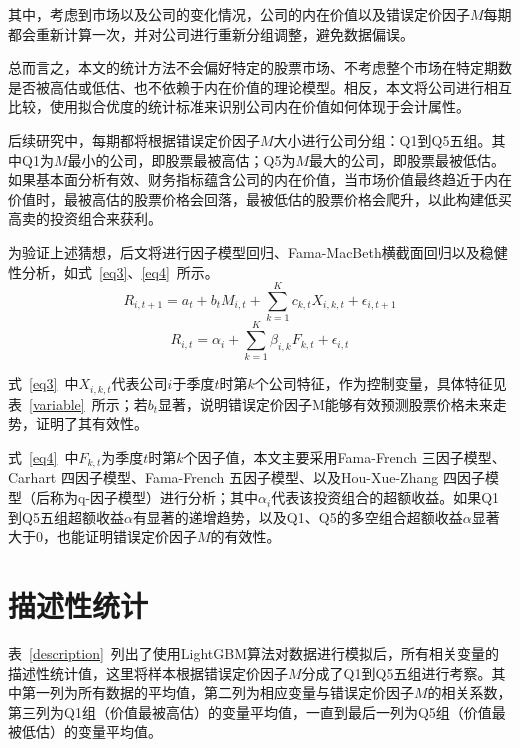其中，考虑到市场以及公司的变化情况，公司的内在价值以及错误定价因子$M$每期都会重新计算一次，并对公司进行重新分组调整，避免数据偏误。

总而言之，本文的统计方法不会偏好特定的股票市场、不考虑整个市场在特定期数是否被高估或低估、也不依赖于内在价值的理论模型。相反，本文将公司进行相互比较，使用拟合优度的统计标准来识别公司内在价值如何体现于会计属性。

后续研究中，每期都将根据错误定价因子$M$大小进行公司分组：Q1到Q5五组。其中Q1为$M$最小的公司，即股票最被高估；Q5为$M$最大的公司，即股票最被低估。如果基本面分析有效、财务指标蕴含公司的内在价值，当市场价值最终趋近于内在价值时，最被高估的股票价格会回落，最被低估的股票价格会爬升，以此构建低买高卖的投资组合来获利。

为验证上述猜想，后文将进行因子模型回归、Fama-MacBeth横截面回归以及稳健性分析，如式~\ref{eq3}、\ref{eq4}~所示。
\begin{equation}
\label{eq3}
R_{i, t+1}=a_{t}+b_{t} M_{i, t}+\sum_{k=1}^{K} c_{k, t} X_{i, k, t}+\epsilon_{i, t+1}
\end{equation}
\begin{equation}
\label{eq4}
R_{i, t}=\alpha_{i}+\sum_{k=1}^{K} \beta_{i, k} F_{k, t}+\epsilon_{i, t}
\end{equation}

式~\ref{eq3}~中$X_{i, k, t}$代表公司$i$于季度$t$时第$k$个公司特征，作为控制变量，具体特征见表~\ref{variable}~所示；若$b_{t}$显著，说明错误定价因子M能够有效预测股票价格未来走势，证明了其有效性。

式~\ref{eq4}~中$F_{k,t}$为季度$t$时第$k$个因子值，本文主要采用Fama-French 三因子模型、Carhart 四因子模型、Fama-French 五因子模型、以及Hou-Xue-Zhang 四因子模型（后称为q-因子模型）进行分析；其中$\alpha_{i}$代表该投资组合的超额收益。如果Q1到Q5五组超额收益$\alpha$有显著的递增趋势，以及Q1、Q5的多空组合超额收益$\alpha$显著大于0，也能证明错误定价因子$M$的有效性。

\section{描述性统计}
表~\ref{description}~列出了使用LightGBM算法对数据进行模拟后，所有相关变量的描述性统计值，这里将样本根据错误定价因子$M$分成了Q1到Q5五组进行考察。其中第一列为所有数据的平均值，第二列为相应变量与错误定价因子$M$的相关系数，第三列为Q1组（价值最被高估）的变量平均值，一直到最后一列为Q5组（价值最被低估）的变量平均值。

